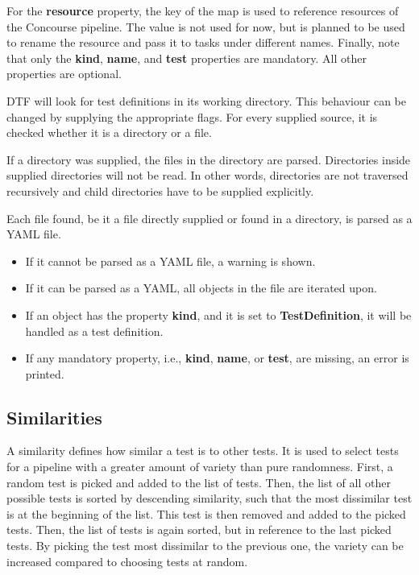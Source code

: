 For the \textbf{resource} property, the key of the map is used to reference resources of the Concourse pipeline.
The value is not used for now, but is planned to be used to rename the resource and pass it to tasks under different names.
Finally, note that only the \textbf{kind}, \textbf{name}, and \textbf{test} properties are mandatory.
All other properties are optional.

DTF will look for test definitions in its working directory.
This behaviour can be changed by supplying the appropriate flags.
For every supplied source, it is checked whether it is a directory or a file.

If a directory was supplied, the files in the directory are parsed.
Directories inside supplied directories will not be read.
In other words, directories are not traversed recursively and child directories have to be supplied explicitly.

\pagebreak

Each file found, be it a file directly supplied or found in a directory, is parsed as a YAML file.
\begin{itemize}
  \item If it cannot be parsed as a YAML file, a warning is shown.
  \item If it can be parsed as a YAML, all objects in the file are iterated upon.
  \item If an object has the property \textbf{kind}, and it is set to \textbf{TestDefinition}, it will be handled as a test definition.
  \item If any mandatory property, i.e., \textbf{kind}, \textbf{name}, or \textbf{test}, are missing, an error is printed.
\end{itemize}

\subsection{Similarities}\label{subsec:similarities}

A similarity defines how similar a test is to other tests.
It is used to select tests for a pipeline with a greater amount of variety than pure randomness.
First, a random test is picked and added to the list of tests.
Then, the list of all other possible tests is sorted by descending similarity, such that the most dissimilar test is at the beginning of the list.
This test is then removed and added to the picked tests.
Then, the list of tests is again sorted, but in reference to the last picked tests.
By picking the test most dissimilar to the previous one, the variety can be increased compared to choosing tests at random.


